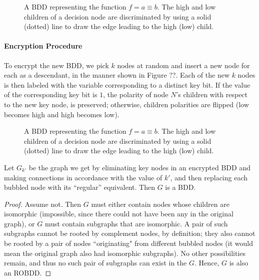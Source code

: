 \begin{lemma}

\end{lemma}

\begin{figure}[ht]
  \caption{A BDD representing the function $f = a \equiv b$. The high and low children of a decision node are discriminated by using a solid (dotted) line to draw the edge leading to the high (low) child.}
  \label{fig:dummy4}
\end{figure}

\paragraph{Encryption Procedure}  To encrypt the new BDD, we pick $k$ nodes at random and insert a new node for each as a descendant, in the manner shown in Figure ??. Each of the new $k$ nodes is then labeled with the variable corresponding to a distinct key bit. If the value of the corresponding key bit is $1$, the polarity of node $N$'s children with respect to the new key node, is preserved; otherwise, children polarities are flipped (low becomes high and high becomes low). %

\begin{figure}[ht]
  \caption{A BDD representing the function $f = a \equiv b$. The high and low children of a decision node are discriminated by using a solid (dotted) line to draw the edge leading to the high (low) child.}
  \label{fig:dummy5}
\end{figure}


\begin{lemma}
Let $G_{k'}$ be the graph we get by eliminating key nodes in an encrypted BDD and making connections in accordance with the value of $k'$, and then replacing each bubbled node with its ``regular'' equivalent. Then $G$ is a BDD.
\end{lemma}

\begin{proof}
Assume not. Then $G$ must either contain nodes whose children are isomorphic (impossible, since there could not have been any in the original graph), or $G$ must contain subgraphs that are isomorphic. A pair of such subgraphs cannot be rooted by complement nodes, by definition; they also cannot be rooted by a pair of nodes ``originating" from different bubbled nodes (it would mean the original graph also had isomorphic subgraphs). No other possibilities remain, and thus no such pair of subgraphs can exist in the $G$. Hence, $G$ is also an ROBDD.
\end{proof}

